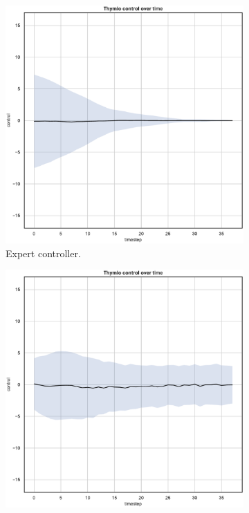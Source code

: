 \begin{figure}[!htb]
	\centering
	\begin{subfigure}[h]{0.3\textwidth}
		\centering
		\includegraphics[width=\textwidth]{contents/images/net-d9/control-overtime-omniscient}%
		\caption{Expert controller.}
	\end{subfigure}
	\hfill
	\begin{subfigure}[h]{0.3\textwidth}
		\centering
		\includegraphics[width=\textwidth]{contents/images/net-d9/control-overtime-manual}%

\end{subfigure}
\end{figure}
